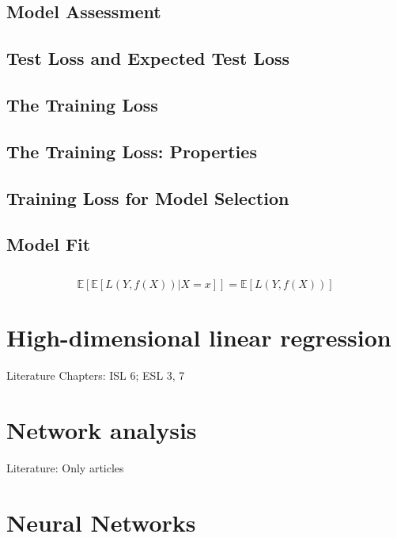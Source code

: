 \documentclass[11pt,a4paper]{article}
\begin{document}
\subsection{Model Assessment}

\subsection{Test Loss and Expected Test Loss}

\subsection{The Training Loss}

\subsection{The Training Loss: Properties}

\subsection{Training Loss for Model Selection}

\subsection{Model Fit}

\subsection{}







\begin{equation}
    \mathbb{E}  [\mathbb{E} [L(Y,f(X))\vert X=x]] = \mathbb{E}  [L(Y,f(X))]
\end{equation}

\section{High-dimensional linear regression}
Literature Chapters: ISL 6; ESL 3, 7

\section{Network analysis}

Literature: Only articles

\section{Neural Networks}
\end{document}
